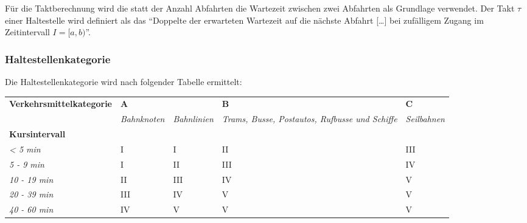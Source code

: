 Für die Taktberechnung wird die statt der Anzahl Abfahrten die Wartezeit zwischen zwei Abfahrten als Grundlage verwendet.
Der Takt $\tau$ einer Haltestelle wird definiert als das "`Doppelte der erwarteten Wartezeit auf die nächste Abfahrt [\ldots] bei zufälligem Zugang im Zeitintervall $I = [a,b)$"'.~\cite{visum_manual_formula}

\subsubsection{Haltestellenkategorie}
\label{Zusammenhang zur Berechnungsmethodik ARE:Haltestellenkategorie}

\begin{itquote}
Die Haltestellenkategorie wird nach folgender Tabelle ermittelt:
\begin{table}[ht]
    \centering
    \begin{itquote}
    \begin{tabular}[c]{l | p{1.7cm} p{1.7cm} | p{1.7cm} | p{1.7cm}}
        \midrule
        \textbf{Verkehrsmittelkategorie}
                                & \multicolumn{2}{l|}{\textbf{A}}
                                & \textbf{B}
                                & \textbf{C}\\
        \textbf{}
                                & \textit{Bahnknoten}
                                & \textit{Bahnlinien}
                                & \textit{Trams, Busse, Postautos, Rufbusse und Schiffe}
                                & \textit{Seilbahnen}\\
        \textbf{Kursintervall}
                                &
                                &
                                &
                                &\\
        \textit{< 5 min}
                                & I
                                & I
                                & II
                                & III\\
        \textit{5 - 9 min}
                                & I
                                & II
                                & III
                                & IV\\
        \textit{10 - 19 min}
                                & II
                                & III
                                & IV
                                & V\\
        \textit{20 - 39 min}
                                & III
                                & IV
                                & V
                                & V\\
        \textit{40 - 60 min}
                                & IV
                                & V
                                & V
                                & V\\
        \bottomrule
    \end{tabular}
    \end{itquote}
\end{table}
\end{itquote}


